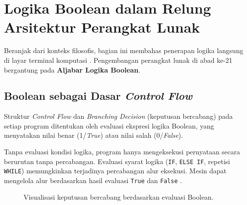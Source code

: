 \section{Logika Boolean dalam Relung Arsitektur Perangkat Lunak}

Beranjak dari konteks filosofis, bagian ini membahas penerapan logika langsung di layar terminal komputasi \cite{levin_discrete,saylor_cs202}. Pengembangan perangkat lunak di abad ke-21 bergantung pada \textbf{Aljabar Logika Boolean}.

\subsection{Boolean sebagai Dasar \textit{Control Flow}}

Struktur \textit{Control Flow} dan \textit{Branching Decision} (keputusan bercabang) pada setiap program ditentukan oleh evaluasi ekspresi logika Boolean, yang menyatakan nilai benar (1/\textit{True}) atau nilai salah (0/\textit{False}).

Tanpa evaluasi kondisi logika, program hanya mengeksekusi pernyataan secara berurutan tanpa percabangan. Evaluasi syarat logika (\texttt{IF}, \texttt{ELSE IF}, repetisi \texttt{WHILE}) memungkinkan terjadinya percabangan alur eksekusi. Mesin dapat mengelola alur berdasarkan hasil evaluasi \texttt{True} dan \texttt{False} \cite{levin_discrete}.

\begin{figure}[H]
\centering
{}
\caption{Visualisasi keputusan bercabang berdasarkan evaluasi Boolean.}
\label{fig:alur-boolean}
\end{figure}

